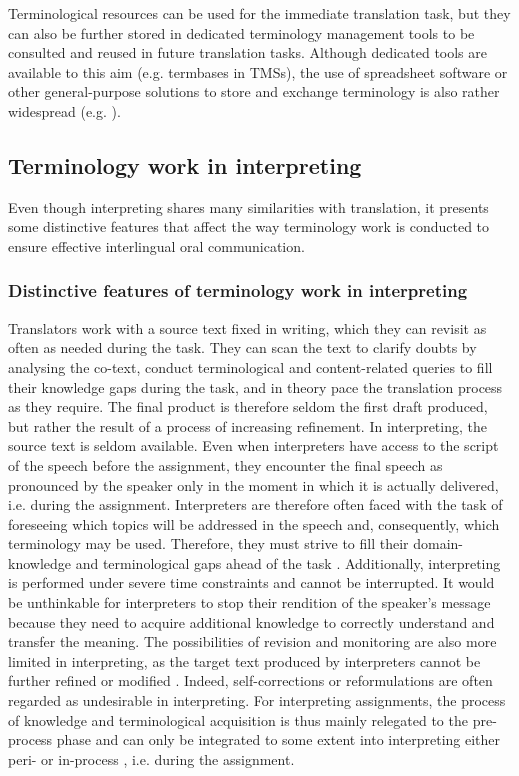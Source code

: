 Terminological resources can be used for the immediate translation task, but they can also be further stored in dedicated terminology management tools to be consulted and reused in future translation tasks. Although dedicated tools are available to this aim (e.g. termbases in TMSs), the use of spreadsheet software or other general-purpose solutions to store and exchange terminology is also rather widespread (e.g. \citealt{SDL2008survey,blancafort2011user}).


\subsection{Terminology work in interpreting} \label{terminology_interpreting}
Even though interpreting shares many similarities with translation, it presents some distinctive features that affect the way terminology work is conducted to ensure effective interlingual oral communication.

\subsubsection{Distinctive features of terminology work in interpreting} \label{featurestermwint}
Translators work with a source text fixed in writing, which they can revisit as often as needed during the task. They can scan the text to clarify doubts by analysing the co-text, conduct terminological and content-related queries to fill their knowledge gaps during the task, and in theory pace the translation process as they require. The final product is therefore seldom the first draft produced, but rather the result of a process of increasing refinement. In interpreting, the source text is seldom available. Even when interpreters have access to the script of the speech before the assignment, they encounter the final speech as pronounced by the speaker only in the moment in which it is actually delivered, i.e. during the assignment. Interpreters are therefore often faced with the task of foreseeing which topics will be addressed in the speech and, consequently, which terminology may be used. Therefore, they must strive to fill their domain-knowledge and terminological gaps ahead of the task \citep[22]{rutten2008zielgerichtet}. Additionally, interpreting is performed under severe time constraints and cannot be interrupted. It would be unthinkable for interpreters to stop their rendition of the speaker's message because they need to acquire additional knowledge to correctly understand and transfer the meaning. The possibilities of revision and monitoring are also more limited in interpreting, as the target text produced by interpreters cannot be further refined or modified \citep[38]{will2020computer}. Indeed, self-corrections or reformulations are often regarded as undesirable in interpreting. For interpreting assignments, the process of knowledge and terminological acquisition is thus mainly relegated to the pre-process phase and can only be integrated to some extent into interpreting either peri- or in-process \citep[778]{kalina_quality_2005}, i.e. during the assignment.

